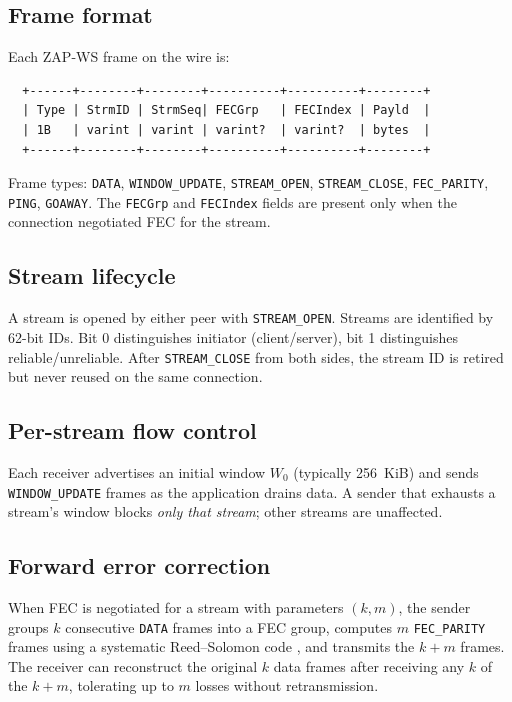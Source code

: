 \documentclass[11pt,a4paper]{article}
\begin{document}
\subsection{Frame format}

Each ZAP-WS frame on the wire is:

\begin{verbatim}
  +------+--------+--------+----------+----------+--------+
  | Type | StrmID | StrmSeq| FECGrp   | FECIndex | Payld  |
  | 1B   | varint | varint | varint?  | varint?  | bytes  |
  +------+--------+--------+----------+----------+--------+
\end{verbatim}

Frame types: \texttt{DATA}, \texttt{WINDOW\_UPDATE},
\texttt{STREAM\_OPEN}, \texttt{STREAM\_CLOSE}, \texttt{FEC\_PARITY},
\texttt{PING}, \texttt{GOAWAY}. The \texttt{FECGrp} and
\texttt{FECIndex} fields are present only when the connection negotiated
FEC for the stream.

\subsection{Stream lifecycle}

A stream is opened by either peer with \texttt{STREAM\_OPEN}. Streams are
identified by 62-bit IDs. Bit 0 distinguishes initiator (client/server),
bit 1 distinguishes reliable/unreliable. After \texttt{STREAM\_CLOSE}
from both sides, the stream ID is retired but never reused on the same
connection.

\subsection{Per-stream flow control}

Each receiver advertises an initial window $W_0$ (typically 256~KiB) and
sends \texttt{WINDOW\_UPDATE} frames as the application drains data. A
sender that exhausts a stream's window blocks \emph{only that stream};
other streams are unaffected.

\subsection{Forward error correction}

When FEC is negotiated for a stream with parameters $(k, m)$, the sender
groups $k$ consecutive \texttt{DATA} frames into a FEC group, computes
$m$ \texttt{FEC\_PARITY} frames using a systematic Reed--Solomon code
\cite{reed1960}, and transmits the $k+m$ frames. The receiver can
reconstruct the original $k$ data frames after receiving any $k$ of the
$k+m$, tolerating up to $m$ losses without retransmission.
\end{document}
